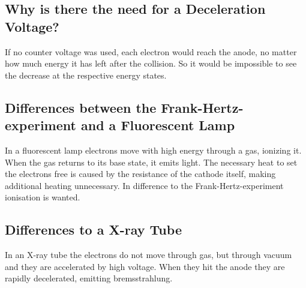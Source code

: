 \documentclass[a4paper,11pt,twoside]{article}
\begin{document}
\subsection{Why is there the need for a Deceleration Voltage?}
If no counter voltage was used, each electron would reach the anode, no matter how much energy it has left after the collision. So it would be impossible to see the decrease at the respective energy states.
\subsection{Differences between the Frank-Hertz-experiment and a Fluorescent Lamp}
In a fluorescent lamp electrons move with high energy through a gas, ionizing it. When the gas returns to its base state, it emits light. The necessary heat to set the electrons free is caused by the resistance of the cathode itself, making additional heating unnecessary. In difference to the Frank-Hertz-experiment ionisation is wanted.
\subsection{Differences to a X-ray Tube}
In an X-ray tube the electrons do not move through gas, but through vacuum and they are accelerated by high voltage. When they hit the anode they are rapidly decelerated, emitting bremsstrahlung.


%
%
%
%


%
\end{document}
